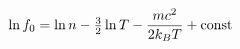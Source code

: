 \documentclass[preview]{standalone}
\begin{document}
\begin{align*}
\special{dvisvgm:raw <g id='unique000'>}\ln f_0=\ln n-\tfrac32\ln T-\frac{mc^2}{2k_BT}+\text{const}\special{dvisvgm:raw </g>}
\end{align*}
\end{document}
